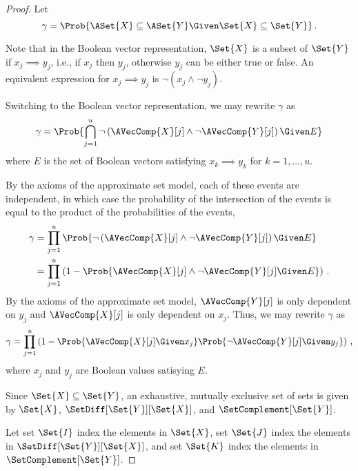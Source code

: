 \begin{proof}
    Let
    \begin{equation}
        \gamma = \Prob{\ASet{X} \subseteq \ASet{Y} \Given \Set{X} \subseteq 
        \Set{Y}}\,.
    \end{equation}
    
    
    Note that in the Boolean vector representation, $\Set{X}$ is a subset of 
    $\Set{Y}$ if $x_j \implies y_j$, i.e., if $x_j$ then $y_j$, otherwise $y_j$ can 
    be either true or false. An equivalent expression for $x_j \implies y_j$ is 
    $\neg (x_j \land \neg y_j)$.
    
    Switching to the Boolean vector representation, we may rewrite $\gamma$ as
    \begin{equation}
        \gamma = \Prob{\bigcap_{j=1}^{u} \neg \left(\AVecComp{X}[j] \land \neg 
        \AVecComp{Y}[j]\right) \Given E}
    \end{equation}
    where $E$ is the set of Boolean vectors satisfying $x_k \implies y_k$ for     
    $k=1,\ldots,u$.
    
    By the axioms of the approximate set model, each of these events are 
    independent, in which case the probability of the intersection of the events is 
    equal to the product of the probabilities of the events,
    \begin{align}
    \gamma
        &= \prod_{j=1}^{u} \Prob{\neg\left(\AVecComp{X}[j] 
            \land \neg \AVecComp{Y}[j]\right) \Given E}\\
        &= \prod_{j=1}^{u} \left(1 - \Prob{\AVecComp{X}[j] 
            \land \neg \AVecComp{Y}[j] \Given E}\right)\,.
    \end{align}
    By the axioms of the approximate set model, $\AVecComp{Y}[j]$ is only dependent 
    on $y_j$ and $\AVecComp{X}[j]$ is only dependent on $x_j$. Thus, we may rewrite 
    $\gamma$ as
    \begin{equation}
    \gamma = \prod_{j=1}^{u}\left(
        1 - \Prob{\AVecComp{X}[j] \Given x_j}
        \Prob{\neg \AVecComp{Y}[j] \Given y_j}\right)\,,
    \end{equation}
    where $x_j$ and $y_j$ are Boolean values satisying $E$.
    
    Since $\Set{X} \subseteq \Set{Y}$, an exhaustive, mutually exclusive set of 
    sets is given by $\Set{X}$, $\SetDiff[\Set{Y}][\Set{X}]$, and 
    $\SetComplement[\Set{Y}]$.
    
    Let set $\Set{I}$ index the elements in $\Set{X}$, set $\Set{J}$ index 
    the elements in $\SetDiff[\Set{Y}][\Set{X}]$, and set $\Set{K}$ index the 
    elements in $\SetComplement[\Set{Y}]$.
    

\end{proof}
